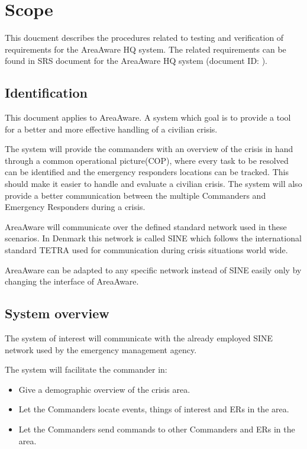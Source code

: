 \chapter{Scope}
\label{chp:scope}

This doucment describes the procedures related to testing and verification of requirements for the AreaAware HQ system. The related requirements can be found in SRS document for the AreaAware HQ system (document ID: \srshq).

\section{Identification}
This document applies to AreaAware.
A system which goal is to provide a tool for a better and more effective handling of a civilian crisis.

The system will provide the commanders with an overview of the crisis in hand through a common operational picture(COP), where every task to be resolved can be identified and the emergency responders locations can be tracked.
This should make it easier to handle and evaluate a civilian crisis. 
The system will also provide a better communication between the multiple Commanders and Emergency Responders during a crisis.

AreaAware will communicate over the defined standard network used in these scenarios.
In Denmark this network is called SINE which follows the international standard TETRA used for communication during crisis situations world wide.

AreaAware can be adapted to any specific network instead of SINE easily only by changing the interface of AreaAware.


\section{System overview}
The system of interest will communicate with the already employed SINE network used by the emergency management agency.

The system will facilitate the commander in:
\begin{itemize}
	\item Give a demographic overview of the crisis area.
	\item Let the Commanders locate events, things of interest and ERs in the area.
	\item Let the Commanders send commands to other Commanders and ERs in the area.
\end{itemize}

